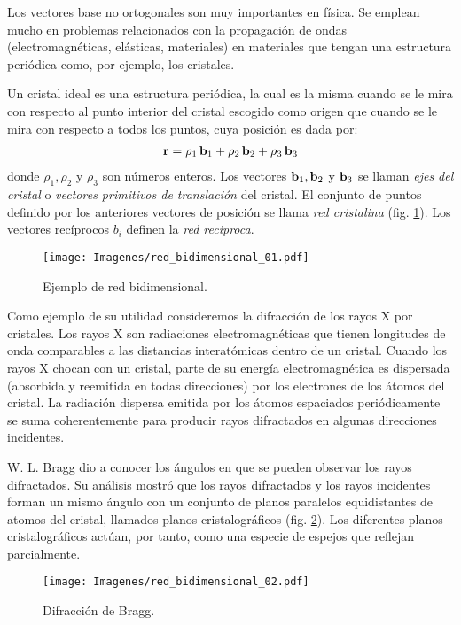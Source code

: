 \documentclass[12pt]{article}
\begin{document}
Los vectores base no ortogonales son muy importantes en física. Se emplean mucho en problemas relacionados con la propagación de ondas (electromagnéticas, elásticas, materiales) en materiales que tengan una estructura periódica como, por ejemplo, los cristales.
\par
Un cristal ideal es una estructura periódica, la cual es la misma cuando se le mira con respecto al punto interior del cristal escogido como origen que cuando se le mira con respecto a todos los puntos, cuya posición es dada por:
\begin{align*}
    \vb{r} = \rho_{1} \, \vb{b}_{1} + \rho_{2} \, \vb{b}_{2} + \rho_{3} \, \vb{b}_{3}
\end{align*}
donde $\rho_{1}, \rho_{2}$ y $\rho_{3}$ son números enteros. Los vectores $\vb{b}_{1}, \vb{b}_{2}$ y $\vb{b}_{3}$ se llaman \emph{ejes del cristal} o \emph{vectores primitivos de translación} del cristal. El conjunto de puntos definido por los anteriores vectores de posición se llama \emph{red cristalina} (fig. \ref{fig:figura_01_14}). Los vectores recíprocos $b_{i}$ definen la \emph{red reciproca}. 
\begin{figure}[H]
    \centering
    \texttt{[image: Imagenes/red\_bidimensional\_01.pdf]}
    \caption{Ejemplo de red bidimensional.}
    \label{fig:figura_01_14}
\end{figure}
Como ejemplo de su utilidad consideremos la difracción de los rayos X por cristales. Los rayos X son radiaciones electromagnéticas que tienen longitudes de onda comparables a las distancias interatómicas dentro de un cristal. Cuando los rayos X chocan con un cristal, parte de su energía electromagnética es dispersada (absorbida y reemitida en todas direcciones) por los electrones de los átomos del cristal. La radiación dispersa emitida por los átomos espaciados periódicamente se suma coherentemente para producir rayos difractados en algunas direcciones incidentes. 
\par
W. L. Bragg dio a conocer los ángulos en que se pueden observar los rayos difractados. Su análisis mostró que los rayos difractados y los rayos incidentes forman un mismo ángulo con un conjunto de planos paralelos equidistantes de atomos del cristal, llamados planos cristalográficos (fig. \ref{fig:figura_01_15}). Los diferentes planos cristalográficos actúan, por tanto, como una especie de espejos que reflejan parcialmente. 
\begin{figure}[H]
    \centering
    \texttt{[image: Imagenes/red\_bidimensional\_02.pdf]}
    \caption{Difracción de Bragg.}
    \label{fig:figura_01_15}
\end{figure}
\end{document}
